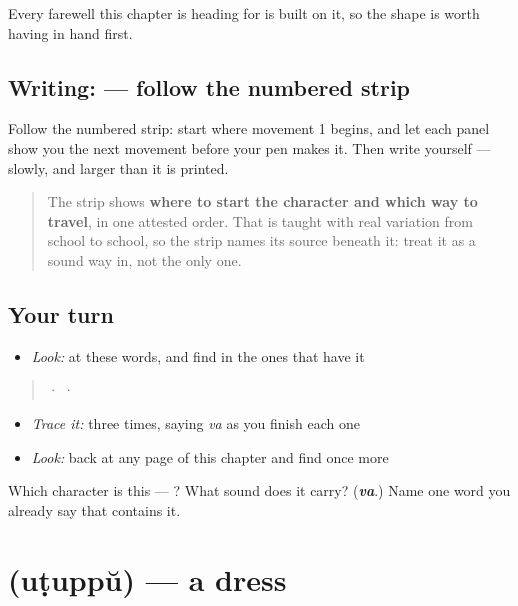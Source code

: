 Every farewell this chapter is heading for is built on it, so the shape is worth having in hand first.

\subsection*{Writing:  — follow the numbered strip}

Follow the numbered strip: start where movement 1 begins, and let each panel show you the next movement before your pen makes it. Then write  yourself — slowly, and larger than it is printed.

\begin{quote}
The strip shows \textbf{where to start the character and which way to travel}, in one attested order. That is taught with real variation from school to school, so the strip names its source beneath it: treat it as a sound way in, not the only one.
\end{quote}

\subsection*{Your turn}
\begin{itemize}
\raggedright
  \item \emph{Look:} at these words, and find  in the ones that have it
\end{itemize}

\begin{quote}
  ·    ·  
\end{quote}

\begin{itemize}
\raggedright
  \item \emph{Trace it:}  three times, saying \emph{va} as you finish each one
  \item \emph{Look:} back at any page of this chapter and find  once more
\end{itemize}

\begin{tcolorbox}[breakable,colback=teal!4,colframe=teal!35!black,title={Before you move on}]
Which character is this — ? What sound does it carry? (\emph{\textbf{va}}.) Name one word you already say that contains it.
\end{tcolorbox}
\section[\texorpdfstring{\ml{ഉടുപ്പ്} (uṭuppŭ)}{ഉടുപ്പ് (uṭuppŭ)}]{ (uṭuppŭ) — a dress}

